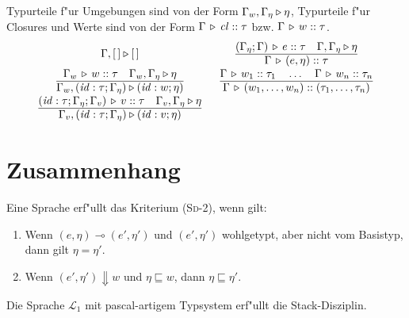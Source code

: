 \documentclass[12pt,fleqn,a4paper]{article}
\newcommand{\RN}[1]{\mbox{\textsc{(#1)}}}
\newcommand{\cl}{\name{cl}}
\begin{document}
\begin{definition}[Typregeln]
  Typurteile f"ur Umgebungen sind von der Form $\Gamma_w,\Gamma_\eta \triangleright \eta$, Typurteile f"ur Closures und
  Werte sind von der Form $\Tj{\Gamma}{\cl}{\tau}$ bzw. $\Gamma \, \triangleright \, w\mathrel{::}\tau$.
  \[\begin{array}{cc}
    \Tjh{\Gamma,[\,]}{[\,]}
    & \regel{\Tj{(\Gamma_\eta;\Gamma)}{e}{\tau} \quad \Tjh{\Gamma,\Gamma_\eta}{\eta}}{\Tj{\Gamma}{(e,\eta)}{\tau}} \\
    \regel{\Tj{\Gamma_w}{w}{\tau} \quad \Tjh{\Gamma_w,\Gamma_\eta}{\eta}}{\Tjh{\Gamma_w,(\id:\tau;\Gamma_\eta)}{(\id:w;\eta)}}
    & \regel{\Tj{\Gamma}{w_1}{\tau_1} \quad \ldots \quad \Tj{\Gamma}{w_n}{\tau_n}}{\Tj{\Gamma}{(w_1,\ldots,w_n)}{(\tau_1,\ldots,\tau_n)}} \\
    \regel{\Tj{(\id:\tau;\Gamma_\eta;\Gamma_v)}{v}{\tau} \quad \Tjh{\Gamma_v,\Gamma_\eta}{\eta}}{\Tjh{\Gamma_v,(\id:\tau;\Gamma_\eta)}{(\id:v;\eta)}}
  \end{array}\]
\end{definition}



\section{Zusammenhang}

\begin{lemma}
  Eine Sprache erf"ullt das Kriterium \RN{Sd-2}, wenn gilt:
  \begin{enumerate}
  \item Wenn $(e,\eta) \multimap (e',\eta')$ und $(e',\eta')$ wohlgetypt, aber nicht vom Basistyp, dann gilt
    $\eta = \eta'$.
  \item Wenn $(e',\eta') \Downarrow w$ und $\eta \sqsubseteq w$, dann $\eta \sqsubseteq \eta'$.
  \end{enumerate}
\end{lemma}

\begin{theorem}
  Die Sprache $\mathcal{L}_1$ mit pascal-artigem Typsystem erf"ullt die Stack-Disziplin.
\end{theorem}
\end{document}
